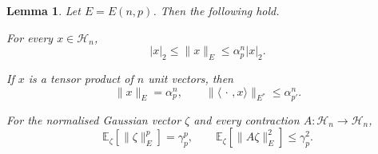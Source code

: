 \documentclass[11pt,a4paper,reqno]{amsart}
\newtheorem{lemma}[lemma]{Lemma}
\theoremstyle{definition}
\newcommand{\norm}[1]{\lVert #1\rVert}
\numberwithin{equation}{section}
\begin{document}
\begin{lemma}\label{lem:packet-estimates}
Let $E=E(n,p)$. Then the following hold.
\begin{resultparts}
\item\label{it:packet-hilbert}
For every $x\in\mathcal H_n$,
\begin{equation*}
 |x|_2\leq\norm x_E\leq \alpha_p^n|x|_2.
\end{equation*}
\item\label{it:packet-products}
If $x$ is a tensor product of $n$ unit vectors, then
\begin{equation*}
 \norm x_E=\alpha_p^n,\qquad
 \norm{\langle\,\cdot\,,x\rangle}_{E^*}\leq\alpha_{p'}^n.
\end{equation*}
\item\label{it:packet-gaussian}
For the normalised Gaussian vector $\zeta$ and every contraction $A\colon\mathcal H_n\to\mathcal H_n$,
\begin{equation*}
 \mathbb E_\zeta[\norm \zeta_E^p]=\gamma_p^p,\qquad
 \mathbb E_\zeta[\norm{A\zeta}_E^2]\leq\gamma_p^2.
\end{equation*}
\end{resultparts}
\end{lemma}
\end{document}
